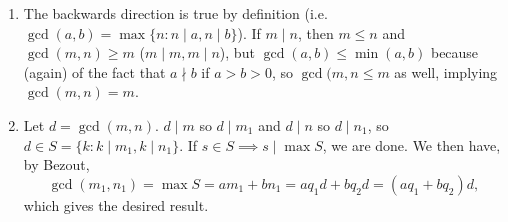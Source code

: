 \documentclass{article}
\theoremstyle{norm}
\begin{document}
\begin{enumerate}
\item The backwards direction is true by definition (i.e. $\gcd(a, b) =
\max \lbrace n : n \mid a, n \mid b \rbrace$). If $m \mid n$, then $m
\leq n$ and $\gcd(m, n) \geq m$ ($m \mid m, m \mid n$), but $\gcd(a, b)
\leq \min(a, b)$ because (again) of the fact that $a \nmid b$ if $a > b
> 0$, so $\gcd(m, n \leq m$ as well, implying $\gcd(m, n) = m$.

\item Let $d = \gcd(m, n)$. $d \mid m$ so $d \mid m_1$ and $d \mid n$ so
$d \mid n_1$, so $d \in S = \lbrace k : k \mid m_1, k \mid n_1 \rbrace$.
If $s \in S \implies s \mid \max S$, we are done. We then have, by
Bezout,
\[ \gcd(m_1, n_1) = \max S = a m_1 + b n_1 = a q_1 d + b q_2 d = (a q_1
+ b q_2) d, \]
which gives the desired result.
\end{enumerate}
\end{document}
